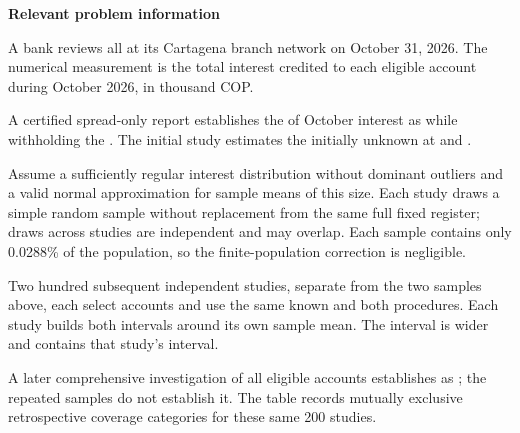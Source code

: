 

\textbf{Relevant problem information}

\begin{probleminfoexcerpt}
A bank reviews all      at its Cartagena branch network on October 31, 2026. The numerical measurement is the total interest credited to each eligible account during October 2026, in thousand COP.
\end{probleminfoexcerpt}

\begin{probleminfoexcerpt}
A certified spread-only report establishes the    of October interest as    while withholding the  . The initial study estimates the initially unknown   at  and  .
\end{probleminfoexcerpt}

\begin{probleminfoexcerpt}
Assume a sufficiently regular interest distribution without dominant outliers and a valid normal approximation for sample means of this size. Each study draws a simple random sample without replacement from the same full fixed register; draws across studies are independent and may overlap. Each sample contains only 0.0288\% of the population, so the finite-population correction is negligible.
\end{probleminfoexcerpt}

\begin{probleminfoexcerpt}
Two hundred subsequent independent studies, separate from the two samples above, each select  accounts and use the same known    and both  procedures. Each study builds both intervals around its own sample mean. The  interval is wider and contains that study's  interval.
\end{probleminfoexcerpt}

\begin{probleminfoexcerpt}
A later comprehensive investigation of all eligible accounts establishes    as   ; the repeated samples do not establish it. The table records mutually exclusive retrospective coverage categories for these same 200 studies.
\end{probleminfoexcerpt}

